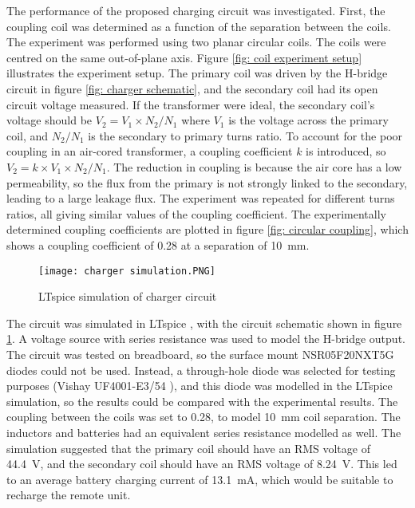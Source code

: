 The performance of the proposed charging circuit was investigated. First, the coupling coil was determined as a function of the separation between the coils. The experiment was performed using two planar circular coils. The coils were centred on the same out-of-plane axis. Figure \ref{fig: coil experiment setup} illustrates the experiment setup. The primary coil was driven by the H-bridge circuit in figure \ref{fig: charger schematic}, and the secondary coil had its open circuit voltage measured. If the transformer were ideal, the secondary coil's voltage should be $V_2 = V_1 \times N_2 / N_1$ where $V_1$ is the voltage across the primary coil, and $N_2 / N_1$ is the secondary to primary turns ratio. To account for the poor coupling in an air-cored transformer, a coupling coefficient $k$ is introduced, so $V_2 = k \times V_1 \times N_2 / N_1$. The reduction in coupling is because the air core has a low permeability, so the flux from the primary is not strongly linked to the secondary, leading to a large leakage flux. The experiment was repeated for different turns ratios, all giving similar values of the coupling coefficient. The experimentally determined coupling coefficients are plotted in figure \ref{fig: circular coupling}, which shows a coupling coefficient of 0.28 at a separation of \SI{10}{\milli\metre}.\\


\begin{figure}[htbp]
	\centering
	\texttt{[image: charger simulation.PNG]}
	\caption{LTspice simulation of charger circuit}
	\label{fig: charger simulation}
\end{figure}

The circuit was simulated in LTspice \cite{ltspice}, with the circuit schematic shown in figure \ref{fig: charger simulation}. A voltage source with series resistance was used to model the H-bridge output. The circuit was tested on breadboard, so the surface mount NSR05F20NXT5G diodes could not be used. Instead, a through-hole diode was selected for testing purposes (Vishay UF4001-E3/54 \cite{tht_diode}), and this diode was modelled in the LTspice simulation, so the results could be compared with the experimental results. The coupling between the coils was set to 0.28, to model \SI{10}{\milli\metre} coil separation. The inductors and batteries had an equivalent series resistance modelled as well. The simulation suggested that the primary coil should have an RMS voltage of \SI{44.4}{\volt}, and the secondary coil should have an RMS voltage of \SI{8.24}{\volt}. This led to an average battery charging current of \SI{13.1}{\milli\ampere}, which would be suitable to recharge the remote unit. \\


